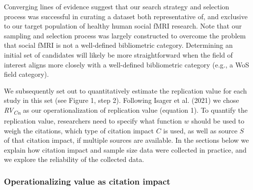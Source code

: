 \documentclass[
  man,floatsintext]{apa6}
\begin{document}
Converging lines of evidence suggest that our search strategy and selection process was successful in curating a dataset both representative of, and exclusive to our target population of healthy human social fMRI research. Note that our sampling and selection process was largely constructed to overcome the problem that social fMRI is not a well-defined bibliometric category. Determining an initial set of candidates will likely be more straightforward when the field of interest aligns more closely with a well-defined bibliometric category (e.g., a WoS field category).

We subsequently set out to quantitatively estimate the replication value for each study in this set (see Figure 1, step 2). Following Isager et al. (2021) we chose \emph{RV\textsubscript{Cn}} as our operationalization of replication value (equation 1). To quantify the replication value, researchers need to specify what function \(w\) should be used to weigh the citations, which type of citation impact \(C\) is used, as well as source \(S\) of that citation impact, if multiple sources are available. In the sections below we explain how citation impact and sample size data were collected in practice, and we explore the reliability of the collected data.

\hypertarget{operationalizing-value-as-citation-impact}{%
\subsubsection{Operationalizing value as citation impact}\label{operationalizing-value-as-citation-impact}}
\end{document}
